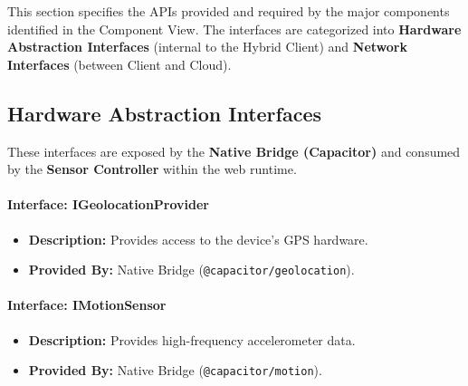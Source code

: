 This section specifies the APIs provided and required by the major components identified in the Component View. The interfaces are categorized into \textbf{Hardware Abstraction Interfaces} (internal to the Hybrid Client) and \textbf{Network Interfaces} (between Client and Cloud).

\subsection{Hardware Abstraction Interfaces}
These interfaces are exposed by the \textbf{Native Bridge (Capacitor)} and consumed by the \textbf{Sensor Controller} within the web runtime.

\paragraph{Interface: IGeolocationProvider}
\begin{itemize}
    \item \textbf{Description:} Provides access to the device's GPS hardware.
    \item \textbf{Provided By:} Native Bridge (\texttt{@capacitor/geolocation}).
\end{itemize}

\begin{table}[H]
\centering
\renewcommand{\arraystretch}{1.4}
\caption{IGeolocationProvider Interface}
\end{table}

\paragraph{Interface: IMotionSensor}
\begin{itemize}
    \item \textbf{Description:} Provides high-frequency accelerometer data.
    \item \textbf{Provided By:} Native Bridge (\texttt{@capacitor/motion}).
\end{itemize}

